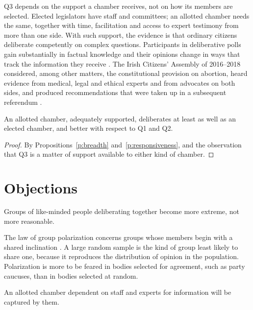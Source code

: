 \documentclass{situationist-preprint}
\begin{document}
Q3 depends on the support a chamber receives, not on how its members are selected. Elected legislators have staff and committees; an allotted chamber needs the same, together with time, facilitation and access to expert testimony from more than one side. With such support, the evidence is that ordinary citizens deliberate competently on complex questions. Participants in deliberative polls gain substantially in factual knowledge and their opinions change in ways that track the information they receive \citep{Fishkin2009}. The Irish Citizens' Assembly of 2016--2018 considered, among other matters, the constitutional provision on abortion, heard evidence from medical, legal and ethical experts and from advocates on both sides, and produced recommendations that were taken up in a subsequent referendum \citep{FarrellSuiterHarris2019}.

\begin{theorem}\label{t:main}
An allotted chamber, adequately supported, deliberates at least as well as an elected chamber, and better with respect to Q1 and Q2.
\end{theorem}

\begin{proof}
By Propositions~\ref{p:breadth} and~\ref{p:responsiveness}, and the observation that Q3 is a matter of support available to either kind of chamber.
\end{proof}

\section{Objections}

\begin{objection}
Groups of like-minded people deliberating together become more extreme, not more reasonable.
\end{objection}

\begin{reply}
The law of group polarization concerns groups whose members begin with a shared inclination \citep{Sunstein2002}. A large random sample is the kind of group least likely to share one, because it reproduces the distribution of opinion in the population. Polarization is more to be feared in bodies selected for agreement, such as party caucuses, than in bodies selected at random.
\end{reply}

\begin{objection}
An allotted chamber dependent on staff and experts for information will be captured by them.
\end{objection}
\end{document}
